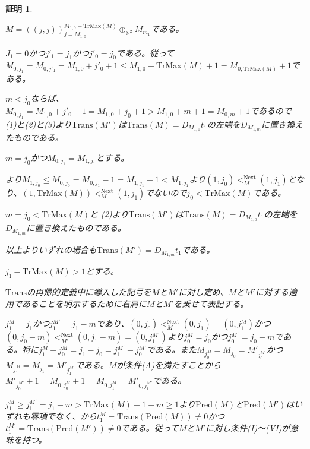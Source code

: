 \documentclass[dvipdfmx,uplatex]{jsarticle}
\theoremstyle{customnonumberbreakfortheorem}
\theoremstyle{customnonumberbreakforproof}
\newtheorem{hideableproof}{証明}
\begin{document}
\begin{hideableproof}
\begin{indented}
\begin{indented}
			\item \(M = ((j,j))_{j=M_{1,0}}^{M_{1,0} + \textrm{TrMax}(M)} \oplus_{\mathbb{N}^2} M_{m_1}\)である。
			\item \(J_1 = 0\)かつ\(j'_1 = j_1\)かつ\(j'_0 = j_0\)である。従って\(M_{0,j_1} = M_{0,j'_1} = M_{1,0} + j'_0 + 1 \leq M_{1,0} + \textrm{TrMax}(M) + 1 = M_{0,\textrm{TrMax}(M)}+1\)である。
			\item \(m < j_0\)ならば、\(M_{0,j_1} = M_{1,0} + j'_0 + 1 = M_{1,0} + j_0 + 1 > M_{1,0} + m + 1= M_{0,m} + 1\)であるので (1)と(2)と(3)より\(\textrm{Trans}(M')\)は\(\textrm{Trans}(M) = D_{M_{1,0}} t_1\)の左端を\(D_{M_{1,m}}\)に置き換えたものである。
			\item \(m = j_0\)かつ\(M_{0,j_1} = M_{1,j_1}\)とする。
			\begin{indented}
				\item {}より\(M_{1,j_0} \leq M_{0,j_0} = M_{0,j_1}-1 = M_{1,j_1}-1 < M_{1,j_1}\)より\((1,j_0) <_M^{\textrm{Next}} (1,j_1)\)となり、\((1,\textrm{TrMax}(M)) <_M^{\textrm{Next}} (1,j_1)\)でないので\(j_0 < \textrm{TrMax}(M)\)である。
				\item \(m = j_0 < \textrm{TrMax}(M)\)と (2)より\(\textrm{Trans}(M')\)は\(\textrm{Trans}(M) = D_{M_{1,0}} t_1\)の左端を\(D_{M_{1,m}}\)に置き換えたものである。
			\end{indented}
			\item 以上よりいずれの場合も\(\textrm{Trans}(M') = D_{M_{1,m}} t_1\)である。
		\end{indented}
		\item
		\item \(j_1 - \textrm{TrMax}(M) > 1\)とする。
		\begin{indented}
			\item \(\textrm{Trans}\)の再帰的定義中に導入した記号を\(M\)と\(M'\)に対し定め、\(M\)と\(M'\)に対する適用であることを明示するために右肩に\(M\)と\(M'\)を乗せて表記する。
			\item \(j_1^M = j_1\)かつ\(j_1^{M'} = j_1-m\)であり、\((0,j_0) <_M^{\textrm{Next}} (0,j_1) = (0,j_1^M)\)かつ\((0,j_0-m) <_{M'}^{\textrm{Next}} (0,j_1-m) = (0,j_1^{M'})\)より\(j_0^M = j_0\)かつ\(j_0^{M'} = j_0-m\)である。特に\(j_1^M-j_0^M = j_1-j_0 = j_1^{M'}-j_0^{M'}\)である。また\(M_{j_0^M} = M_{j_0} = M'_{j_0^{M'}}\)かつ\(M_{j_1^M} = M_{j_1} = M'_{j_1^{M'}}\)である。\(M\)が条件(A)を満たすことから\(M'_{j_0^{M'}}+1 = M_{0,j_0^M}+1 = M_{0,j_1^M} = M'_{0,j_1^{M'}}\)である。
			\item \(j_1^M \geq j_1^{M'} = j_1-m > \textrm{TrMax}(M)+1-m \geq 1\)より\(\textrm{Pred}(M)\)と\(\textrm{Pred}(M')\)はいずれも零項でなく、から\(t_1^M = \textrm{Trans}(\textrm{Pred}(M)) \neq 0\)かつ\(t_1^{M'} = \textrm{Trans}(\textrm{Pred}(M')) \neq 0\)である。従って\(M\)と\(M'\)に対し条件(I)～(VI)が意味を持つ。

\end{indented}
\end{indented}
\end{hideableproof}
\end{document}
